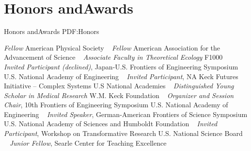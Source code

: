 \section
{Honors and\newline Awards}
{Honors and\newline Awards}
{PDF:Honors}

\textit{Fellow}
\newline
American Physical Society
\newline
~
\Gap
{}
\textit{Fellow}
\newline
American Association for the Advancement of Science
\newline
~
\Gap
{}
\textit{Associate Faculty in Theoretical Ecology}
\newline
F1000
\newline
~
\Gap
{}
\textit{Invited Participant (declined)}, Japan-U.S. Frontiers of Engineering Symposium 
\newline
U.S. National Academy of Engineering
\newline
~
\Gap
{}
\textit{Invited Participant}, NA Keck Futures Initiative -- Complex Systems 
\newline
U.S National Academies
\newline
~
\Gap
{}
\textit{Distinguished Young Scholar in Medical Research}
\newline
W.M. Keck Foundation 
\newline
~
\Gap
{}
\textit{Organizer and Session Chair}, 10th Frontiers of Engineering Symposium 
\newline
U.S. National Academy of Engineering
\newline
~
\Gap
{}
\textit{Invited Speaker}, German-American Frontiers of Science Symposium 
\newline
U.S. National Academy of Sciences and Humboldt Foundation
\newline
~
\Gap
{}
\textit{Invited Participant}, Workshop on Transformative Research 
\newline
U.S. National Science Board
\newline
~
\Gap
{}
\textit{Junior Fellow}, Searle Center for Teaching Excellence 
\newline

